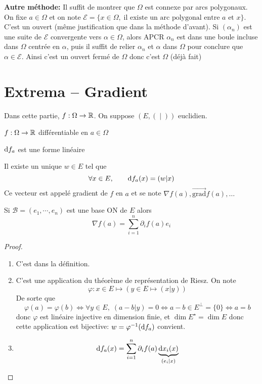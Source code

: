 \textbf{Autre méthode:} Il suffit de montrer que $\Omega$ est connexe par arcs polygonaux. On fixe $a\in\Omega$ et on note $\mathcal E=\{x\in\Omega, \; \text{il existe un arc polygonal entre }a \text{ et } x\}$. C'est un ouvert (même justification que dans la méthode d'avant). Si $(\alpha_n)$ est une suite de $\mathcal E$ convergente vers $\alpha\in\Omega$, alors APCR $\alpha_n$ est dans une boule incluse dans $\Omega$ centrée en $\alpha$, puis il suffit de relier $\alpha_n$ et $\alpha$ dans $\Omega$ pour conclure que $\alpha\in\mathcal E$. Ainsi c'est un ouvert fermé de $\Omega$ donc c'est $\Omega$ (déjà fait)

\section{Extrema -- Gradient}

Dans cette partie, $f:\Omega\to\mathbb R$. On suppose $(E, (\;|\;))$ euclidien.

\begin{thmdef}
    \Hyp $f:\Omega\to\mathbb R$ différentiable en $a\in\Omega$
    \begin{concenum}
    \item $\mathrm{d} f_a$ est une forme linéaire
    \item Il existe un unique $w\in E$ tel que \[
            \forall x\in E, \qquad \mathrm{d} f_a(x)=(w|x)
        \]
        Ce vecteur est appelé gradient de $f$ en $a$ et se note $\nabla f(a), \overrightarrow{\mathrm{grad}} f(a), \dots$
    \item Si $\mathcal B=(e_1, \cdots, e_n)$ est une base ON de $E$ alors \[
            \nabla f(a)=\sum_{i=1}^n\partial_i f(a)e_i
        \]
    \end{concenum}
\end{thmdef}

\begin{proof}~
    \begin{enumerate}
        \item C'est dans la définition.
        \item C'est une application du théorème de représentation de Riesz. On note \[
                \varphi:x\in E\longmapsto(y\in E\longmapsto (x|y))
            \]
            De sorte que \[
                \varphi(a)=\varphi(b)\iff \forall y\in E,\;(a-b|y)=0\iff a-b\in E^\perp=\{0\}\iff a=b
            \]
            donc $\varphi$ est linéaire injective en dimension finie, et $\dim E^\star=\dim E$ donc cette application est bijective: $w=\varphi^{-1}(\mathrm{d} f_a)$ convient.
        \item \[
                \mathrm{d} f_a(x)=\sum_{i=1}^n\partial_if(a)\underbrace{\mathrm{d} x_i(x)}_{(e_i|x)}
            \]
    \end{enumerate}
\end{proof}

